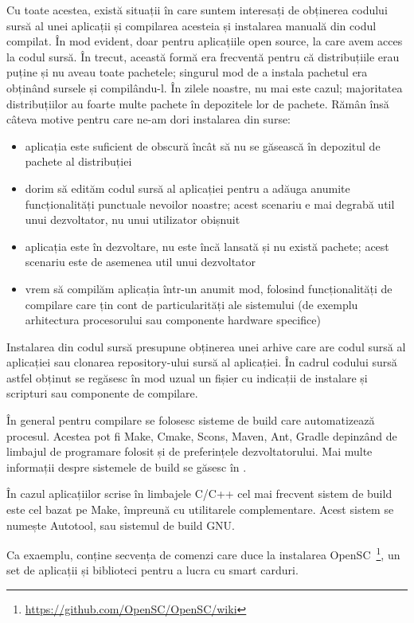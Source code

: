 Cu toate acestea, există situații în care suntem interesați de obținerea codului sursă al unei aplicații și compilarea acesteia și instalarea manuală din codul compilat. În mod evident, doar pentru aplicațiile open source, la care avem acces la codul sursă. În trecut, această formă era frecventă pentru că distribuțiile erau puține și nu aveau toate pachetele; singurul mod de a instala pachetul era obținând sursele și compilându-l. În zilele noastre, nu mai este cazul; majoritatea distribuțiilor au foarte multe pachete în depozitele lor de pachete. Rămân însă câteva motive pentru care ne-am dori instalarea din surse:

\begin{itemize}
  \item aplicația este suficient de obscură încât să nu se găsească în depozitul de pachete al distribuției
  \item dorim să edităm codul sursă al aplicației pentru a adăuga anumite funcționalități punctuale nevoilor noastre; acest scenariu e mai degrabă util unui dezvoltator, nu unui utilizator obișnuit
  \item aplicația este în dezvoltare, nu este încă lansată și nu există pachete; acest scenariu este de asemenea util unui dezvoltator
  \item vrem să compilăm aplicația într-un anumit mod, folosind funcționalități de compilare care țin cont de particularități ale sistemului (de exemplu arhitectura procesorului sau componente hardware specifice)
\end{itemize}

Instalarea din codul sursă presupune obținerea unei arhive care are codul sursă al aplicației sau clonarea repository-ului sursă al aplicației. În cadrul codului sursă astfel obținut se regăsesc în mod uzual un fișier  cu indicații de instalare și scripturi sau componente de compilare.

În general pentru compilare se folosesc sisteme de build care automatizează procesul. Acestea pot fi Make, Cmake, Scons, Maven, Ant, Gradle depinzând de limbajul de programare folosit și de preferințele dezvoltatorului. Mai multe informații despre sistemele de build se găsesc în .

În cazul aplicațiilor scrise în limbajele C/C++ cel mai frecvent sistem de build este cel bazat pe Make, împreună cu utilitarele complementare. Acest sistem se numește Autotool, sau sistemul de build GNU.

Ca exaemplu,  conține secvența de comenzi care duce la instalarea OpenSC~\footnote{\url{https://github.com/OpenSC/OpenSC/wiki}}, un set de aplicații și biblioteci pentru a lucra cu smart carduri.

